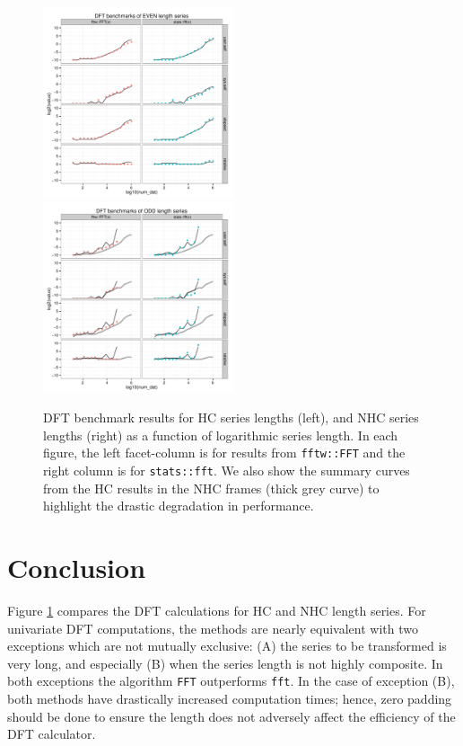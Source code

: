 \documentclass[10pt]{article}\usepackage[]{graphicx}\usepackage[]{color}
\newcommand{\Rcmd}[1]{\texttt{#1}}
\begin{document}
\begin{figure}[htb!]
\begin{center}
\includegraphics[width=0.5\textwidth]{fftw_bench_even}%
\includegraphics[width=0.5\textwidth]{fftw_bench_odd}
\caption{ DFT benchmark results for HC series lengths (left),
and NHC series lengths (right) as a function of logarithmic
series length.  In each figure, the left
facet-column is for results from \Rcmd{fftw::FFT} and the right
column is for \Rcmd{stats::fft}.
We also show the summary curves from the HC results
in the NHC frames (thick grey curve)
to highlight the drastic degradation in performance.}
\label{fig:results}
\end{center}
\end{figure}

\section{Conclusion}

Figure \ref{fig:results} compares the DFT
calculations for HC and NHC length series.
For univariate DFT computations,
the methods are nearly equivalent with two exceptions which
are not mutually exclusive: 
(A) the series to be transformed is very long, and 
especially (B) when the series length is not highly composite.
In both exceptions the algorithm \Rcmd{FFT} outperforms \Rcmd{fft}.
In the case of exception (B), both methods have
drastically increased computation times; hence, zero padding should be
done to ensure the length does not adversely
affect the efficiency of the DFT calculator.
\end{document}
